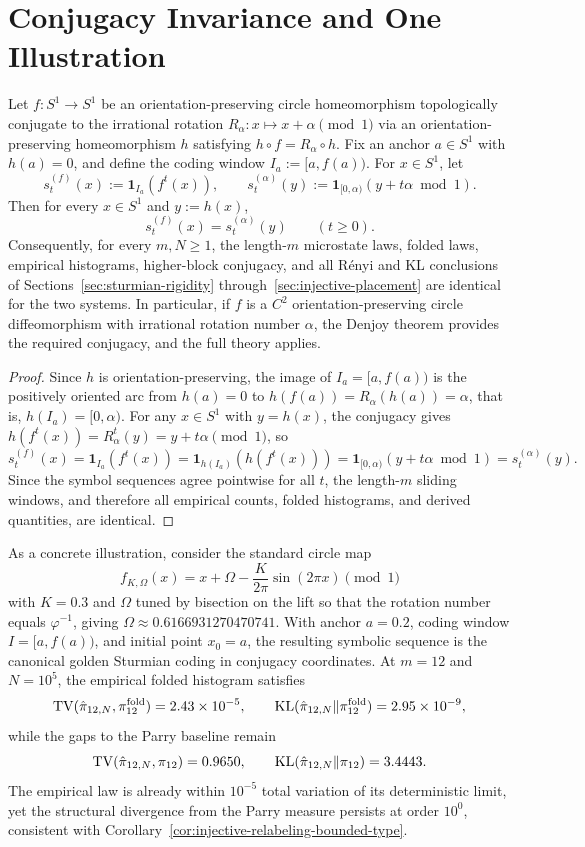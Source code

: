 \section{Conjugacy Invariance and One Illustration}
\label{sec:conjugacy}

\begin{theorem}
\label{thm:audit-conjugacy-invariance}
Let \(f:S^1\to S^1\) be an orientation-preserving circle homeomorphism
topologically conjugate to the irrational rotation
\(R_\alpha:x\mapsto x+\alpha\pmod 1\) via an orientation-preserving
homeomorphism \(h\) satisfying \(h\circ f=R_\alpha\circ h\). Fix an anchor
\(a\in S^1\) with \(h(a)=0\), and define the coding window
\(I_a:=[a,f(a))\). For \(x\in S^1\), let
\[
s_t^{(f)}(x):=\mathbf{1}_{I_a}(f^t(x)),
\qquad
s_t^{(\alpha)}(y):=\mathbf{1}_{[0,\alpha)}(y+t\alpha\bmod 1).
\]
Then for every \(x\in S^1\) and \(y:=h(x)\),
\[
s_t^{(f)}(x)=s_t^{(\alpha)}(y)
\qquad(t\ge 0).
\]
Consequently, for every \(m,N\ge 1\), the length-\(m\) microstate laws,
folded laws, empirical histograms, higher-block conjugacy, and all
R\'enyi and KL conclusions of Sections~\ref{sec:sturmian-rigidity}
through~\ref{sec:injective-placement} are identical for the two systems.
In particular, if \(f\) is a \(C^2\) orientation-preserving circle
diffeomorphism with irrational rotation number \(\alpha\), the Denjoy
theorem provides the required conjugacy, and the full theory applies.
\end{theorem}

\begin{proof}
Since \(h\) is orientation-preserving, the image of \(I_a=[a,f(a))\) is the
positively oriented arc from \(h(a)=0\) to
\(h(f(a))=R_\alpha(h(a))=\alpha\), that is, \(h(I_a)=[0,\alpha)\). For any
\(x\in S^1\) with \(y=h(x)\), the conjugacy gives
\(h(f^t(x))=R_\alpha^t(y)=y+t\alpha\pmod 1\), so
\[
s_t^{(f)}(x)
=\mathbf{1}_{I_a}(f^t(x))
=\mathbf{1}_{h(I_a)}(h(f^t(x)))
=\mathbf{1}_{[0,\alpha)}(y+t\alpha\bmod 1)
=s_t^{(\alpha)}(y).
\]
Since the symbol sequences agree pointwise for all \(t\), the length-\(m\)
sliding windows, and therefore all empirical counts, folded histograms, and
derived quantities, are identical.
\end{proof}

As a concrete illustration, consider the standard circle map
\[
f_{K,\Omega}(x)=x+\Omega-\frac{K}{2\pi}\sin(2\pi x)\pmod 1
\]
with \(K=0.3\) and \(\Omega\) tuned by bisection on the lift so that the
rotation number equals \(\varphi^{-1}\), giving
\(\Omega\approx 0.6166931270470741\). With anchor \(a=0.2\), coding window
\(I=[a,f(a))\), and initial point \(x_0=a\), the resulting symbolic sequence
is the canonical golden Sturmian coding in conjugacy coordinates.
At \(m=12\) and \(N=10^5\), the empirical folded histogram satisfies
\[
\operatorname{TV}(\hat\pi_{12,N},\pi_{12}^{\mathrm{fold}})
=2.43\times 10^{-5},
\qquad
\operatorname{KL}(\hat\pi_{12,N}\|\pi_{12}^{\mathrm{fold}})
=2.95\times 10^{-9},
\]
while the gaps to the Parry baseline remain
\[
\operatorname{TV}(\hat\pi_{12,N},\pi_{12})=0.9650,
\qquad
\operatorname{KL}(\hat\pi_{12,N}\|\pi_{12})=3.4443.
\]
The empirical law is already within \(10^{-5}\) total variation of its
deterministic limit, yet the structural divergence from the Parry measure
persists at order \(10^0\), consistent with
Corollary~\ref{cor:injective-relabeling-bounded-type}.
